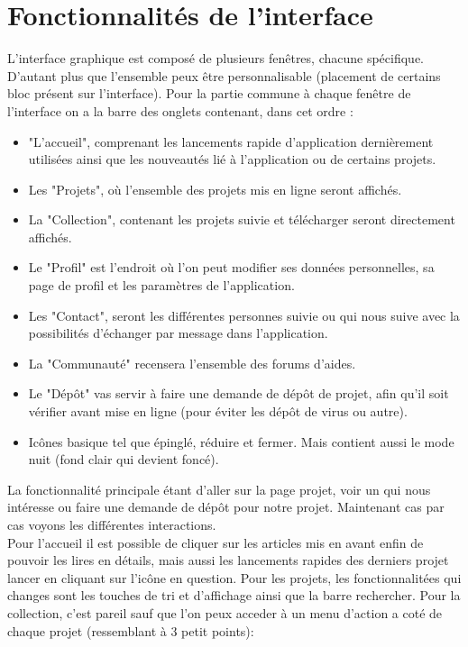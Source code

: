 \documentclass{report}
\begin{document}
\section{Fonctionnalités de l'interface}
L'interface graphique est composé de plusieurs fenêtres, chacune spécifique. D'autant plus que l'ensemble peux être personnalisable (placement de certains bloc présent sur l'interface). Pour la partie commune à chaque fenêtre de l'interface
on a la barre des onglets contenant, dans cet ordre :
\vspace{0.5cm}
\begin{itemize}
    \item "L'accueil", comprenant les lancements rapide d'application dernièrement utilisées ainsi que les nouveautés lié à l'application ou de certains projets.
    \item Les "Projets", où l'ensemble des projets mis en ligne seront affichés. 
    \item La "Collection", contenant les projets suivie et télécharger seront directement affichés.
    \item Le "Profil" est l'endroit où l'on peut modifier ses données personnelles, sa page de profil et les paramètres de l'application.
    \item Les "Contact", seront les différentes personnes suivie ou qui nous suive avec la possibilités d'échanger par message dans l'application.
    \item La "Communauté" recensera l'ensemble des forums d'aides.
    \item Le "Dépôt" vas servir à faire une demande de dépôt de projet, afin qu'il soit vérifier avant mise en ligne (pour éviter les dépôt de virus ou autre).
    \item Icônes basique tel que épinglé, réduire et fermer. Mais contient aussi le mode nuit (fond clair qui devient foncé).
\end{itemize}
\vspace{0.5cm}
La fonctionnalité principale étant d'aller sur la page projet, voir un qui nous intéresse ou faire une demande de dépôt pour notre projet. Maintenant cas par cas voyons les différentes interactions.\\
Pour l'accueil il est possible de cliquer sur les articles mis en avant enfin de pouvoir les lires en détails, mais aussi les lancements rapides des derniers projet lancer en cliquant sur l'icône en question. Pour les projets, les fonctionnalitées qui changes sont les touches de tri et d'affichage ainsi que la barre rechercher. Pour la collection, c'est pareil sauf que l'on peux acceder à un menu d'action a coté de chaque projet (ressemblant à 3 petit points):
\end{document}
